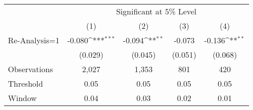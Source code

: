 {
\def\sym#1{\ifmmode^{#1}\else\(^{#1}\)\fi}
\begin{tabular}{l*{4}{c}}
\hline\hline
                    &\multicolumn{4}{c}{Significant at 5\% Level}                                           \\
                    &\multicolumn{1}{c}{(1)}         &\multicolumn{1}{c}{(2)}         &\multicolumn{1}{c}{(3)}         &\multicolumn{1}{c}{(4)}         \\
\hline
Re-Analysis=1       &      -0.080\sym{***}&      -0.094\sym{**} &      -0.073         &      -0.136\sym{**} \\
                    &     (0.029)         &     (0.045)         &     (0.051)         &     (0.068)         \\
\hline
Observations        &       2,027         &       1,353         &         801         &         420         \\
Threshold           &        0.05         &        0.05         &        0.05         &        0.05         \\
Window              &        0.04         &        0.03         &        0.02         &        0.01         \\
\hline\hline
\end{tabular}
}
